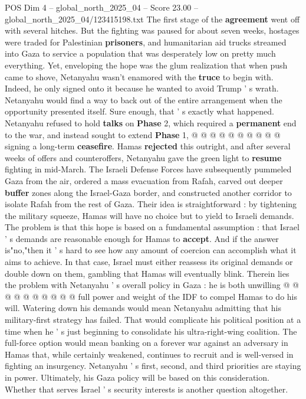 \begin{textsample}{POS Dim 4 – global\_north\_2025\_04 – Score 23.00 – global\_north\_2025\_04/123415198.txt}
The first stage of the \textbf{agreement} went off with several hitches.
But the fighting was paused for about seven weeks, hostages were traded for Palestinian \textbf{prisoners}, and humanitarian aid trucks streamed into Gaza to service a population that was desperately low on pretty much everything.
Yet, enveloping the hope was the glum realization that when push came to shove, Netanyahu wasn't enamored with the \textbf{truce} to begin with.
Indeed, he only signed onto it because he wanted to avoid Trump ' s wrath.
Netanyahu would find a way to back out of the entire arrangement when the opportunity presented itself.
Sure enough, that ' s exactly what happened.
Netanyahu refused to hold \textbf{talks} on \textbf{Phase} 2, which required a \textbf{permanent} end to the war, and instead sought to extend \textbf{Phase} 1, @ @ @ @ @ @ @ @ @ @ signing a long-term \textbf{ceasefire}.
Hamas \textbf{rejected} this outright, and after several weeks of offers and counteroffers, Netanyahu gave the green light to \textbf{resume} fighting in mid-March.
The Israeli Defense Forces have subsequently pummeled Gaza from the air, ordered a mass evacuation from Rafah, carved out deeper \textbf{buffer} zones along the Israel-Gaza border, and constructed another corridor to isolate Rafah from the rest of Gaza.
Their idea is straightforward : by tightening the military squeeze, Hamas will have no choice but to yield to Israeli demands.
The problem is that this hope is based on a fundamental assumption : that Israel ' s demands are reasonable enough for Hamas to \textbf{accept}.
And if the answer is"no,"then it ' s hard to see how any amount of coercion can accomplish what it aims to achieve.
In that case, Israel must either reassess its original demands or double down on them, gambling that Hamas will eventually blink.
Therein lies the problem with Netanyahu ' s overall policy in Gaza : he is both unwilling @ @ @ @ @ @ @ @ @ @ full power and weight of the IDF to compel Hamas to do his will.
Watering down his demands would mean Netanyahu admitting that his military-first strategy has failed.
That would complicate his political position at a time when he ' s just beginning to consolidate his ultra-right-wing coalition.
The full-force option would mean banking on a forever war against an adversary in Hamas that, while certainly weakened, continues to recruit and is well-versed in fighting an insurgency.
Netanyahu ' s first, second, and third priorities are staying in power.
Ultimately, his Gaza policy will be based on this consideration.
Whether that serves Israel ' s security interests is another question altogether.

\end{textsample}
